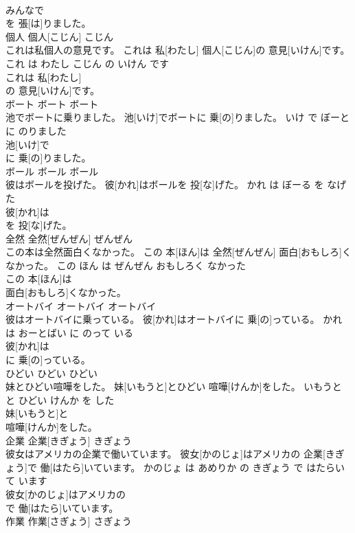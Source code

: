 \documentclass[8pt]{extreport}
\begin{document}
\begin{CJK}{UTF8}{min}
\\	みんなで
\\	を 張[は]りました。			
\\	個人	個人[こじん]	こじん	
\\	これは私個人の意見です。	これは 私[わたし] 個人[こじん]の 意見[いけん]です。	これ は わたし こじん の いけん です	
\\	これは 私[わたし]
\\	の 意見[いけん]です。			
\\	ボート	ボート	ボート	
\\	池でボートに乗りました。	池[いけ]でボートに 乗[の]りました。	いけ で ぼーと に のりました	
\\	池[いけ]で
\\	に 乗[の]りました。			
\\	ボール	ボール	ボール	
\\	彼はボールを投げた。	彼[かれ]はボールを 投[な]げた。	かれ は ぼーる を なげた	
\\	彼[かれ]は
\\	を 投[な]げた。			
\\	全然	全然[ぜんぜん]	ぜんぜん	
\\	この本は全然面白くなかった。	この 本[ほん]は 全然[ぜんぜん] 面白[おもしろ]くなかった。	この ほん は ぜんぜん おもしろく なかった	
\\	この 本[ほん]は
\\	面白[おもしろ]くなかった。			
\\	オートバイ	オートバイ	オートバイ	
\\	彼はオートバイに乗っている。	彼[かれ]はオートバイに 乗[の]っている。	かれ は おーとばい に のって いる	
\\	彼[かれ]は
\\	に 乗[の]っている。			
\\	ひどい	ひどい	ひどい	
\\	妹とひどい喧嘩をした。	妹[いもうと]とひどい 喧嘩[けんか]をした。	いもうと と ひどい けんか を した	
\\	妹[いもうと]と
\\	喧嘩[けんか]をした。			
\\	企業	企業[きぎょう]	きぎょう	
\\	彼女はアメリカの企業で働いています。	彼女[かのじょ]はアメリカの 企業[きぎょう]で 働[はたら]いています。	かのじょ は あめりか の きぎょう で はたらいて います	
\\	彼女[かのじょ]はアメリカの
\\	で 働[はたら]いています。			
\\	作業	作業[さぎょう]	さぎょう	

\end{CJK}
\end{document}
